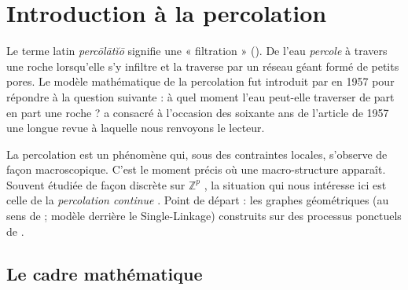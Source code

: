 


\section{Introduction à la percolation}

Le terme latin \emph{percōlātĭō} signifie une « filtration » (). De l'eau \emph{percole} à travers une roche lorsqu'elle s'y infiltre et la traverse par un réseau géant formé de petits pores. Le modèle mathématique de la percolation fut introduit par  \cite{BroadbentHammersley1957} en 1957 pour répondre à la question suivante : à quel moment l'eau peut-elle traverser de part en part une roche ?  \cite{SoixanteAnsPercolation} a consacré à l'occasion des soixante ans de l'article de 1957 une longue revue à laquelle nous renvoyons le lecteur.

La percolation est un phénomène qui, sous des contraintes locales, s'observe de façon macroscopique. C'est le moment précis où une macro-structure apparaît. Souvent étudiée de façon discrète sur $\mathbb Z^p$ \cite{Grimmett1999, Percolation2006}, la situation qui nous intéresse ici est celle de la \emph{percolation continue} \cite{MeesterRoy, penrose2003}. Point de départ : les graphes géométriques (au sens de  \cite{Penrose1995, penrose2003} ; modèle derrière le Single-Linkage) construits sur des processus ponctuels de .

\subsection{Le cadre mathématique}

